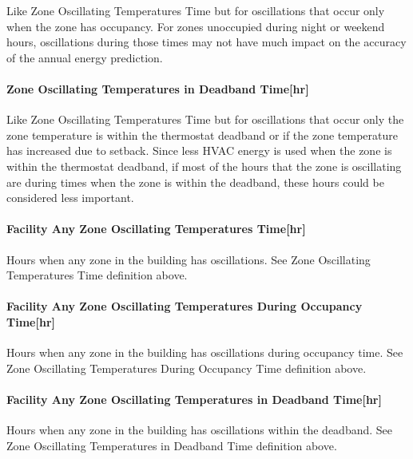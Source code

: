 Like Zone Oscillating Temperatures Time but for oscillations that occur only when the zone has occupancy. For zones unoccupied during night or weekend hours, oscillations during those times may not have much impact on the accuracy of the annual energy prediction.

\paragraph{Zone Oscillating Temperatures in Deadband Time{[}hr{]}}\label{zone-oscillating-temperatures-in-deadband-timehr}

Like Zone Oscillating Temperatures Time but for oscillations that occur only the zone temperature is within the thermostat deadband or if the zone temperature has increased due to setback. Since less HVAC energy is used when the zone is within the thermostat deadband, if most of the hours that the zone is oscillating are during times when the zone is within the deadband, these hours could be considered less important.

\paragraph{Facility Any Zone Oscillating Temperatures Time{[}hr{]}}\label{facility-any-zone-oscillating-temperatures-timehr}

Hours when any zone in the building has oscillations. See Zone Oscillating Temperatures Time definition above.

\paragraph{Facility Any Zone Oscillating Temperatures During Occupancy Time{[}hr{]}}\label{facility-any-zone-oscillating-temperatures-during-occupancy-timehr}

Hours when any zone in the building has oscillations during occupancy time. See Zone Oscillating Temperatures During Occupancy Time definition above.

\paragraph{Facility Any Zone Oscillating Temperatures in Deadband Time{[}hr{]}}\label{facility-any-zone-oscillating-temperatures-in-deadband-timehr}

Hours when any zone in the building has oscillations within the deadband. See Zone Oscillating Temperatures in Deadband Time definition above.


